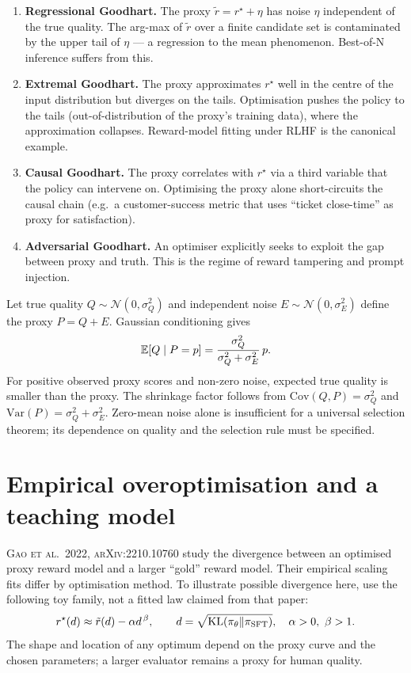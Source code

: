 \documentclass[11pt,oneside]{scrbook}
\begin{document}
\begin{enumerate}\setlength{\itemsep}{2pt}
  \item \textbf{Regressional Goodhart.} The proxy $\tilde r = r^\star + \eta$
        has noise $\eta$ independent of the true quality. The arg-max of
        $\tilde r$ over a finite candidate set is contaminated by the
        upper tail of $\eta$ --- a regression to the mean phenomenon.
        Best-of-N inference suffers from this.
  \item \textbf{Extremal Goodhart.} The proxy approximates $r^\star$
        well in the centre of the input distribution but diverges on the
        tails. Optimisation pushes the policy to the tails (out-of-distribution
        of the proxy's training data), where the approximation collapses.
        Reward-model fitting under RLHF is the canonical example.
  \item \textbf{Causal Goodhart.} The proxy correlates with $r^\star$ via
        a third variable that the policy can intervene on. Optimising the
        proxy alone short-circuits the causal chain (e.g.\ a customer-success
        metric that uses ``ticket close-time'' as proxy for satisfaction).
  \item \textbf{Adversarial Goodhart.} An optimiser explicitly seeks to
        exploit the gap between proxy and truth. This is the regime of
        reward tampering and prompt injection.
\end{enumerate}

\begin{example}
Let true quality $Q\sim\mathcal N(0,\sigma_Q^2)$ and independent noise
$E\sim\mathcal N(0,\sigma_E^2)$ define the proxy $P=Q+E$.
Gaussian conditioning gives
\[
 \mathbb{E}[Q\mid P=p]=\frac{\sigma_Q^2}{\sigma_Q^2+\sigma_E^2}\,p.
\]
For positive observed proxy scores and non-zero noise, expected true
quality is smaller than the proxy. The shrinkage factor follows from
$\mathrm{Cov}(Q,P)=\sigma_Q^2$ and
$\mathrm{Var}(P)=\sigma_Q^2+\sigma_E^2$.
Zero-mean noise alone is insufficient for a universal selection theorem;
its dependence on quality and the selection rule must be specified.
\end{example}

\section{Empirical overoptimisation and a teaching model}

\textsc{Gao et al.\ 2022, arXiv:2210.10760} study the divergence
between an optimised proxy reward model and a larger ``gold'' reward model.
Their empirical scaling fits differ by optimisation method. To illustrate
possible divergence here, use the following toy family, not a fitted law
claimed from that paper:
\begin{equation}\label{eq:gao}
  r^\star(d) \approx \tilde r(d)-\alpha d^{\,\beta},
  \qquad d=\sqrt{\KL(\pi_\theta\|\pi_\text{SFT})},\quad\alpha>0,\ \beta>1.
\end{equation}
The shape and location of any optimum depend on the proxy curve and the
chosen parameters; a larger evaluator remains a proxy for human quality.
\end{document}
